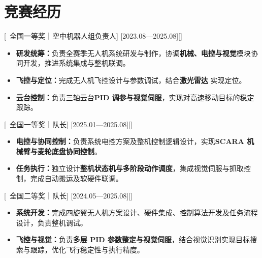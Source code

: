 \documentclass{resume}
\begin{document}
\section{\textcolor{myblue}{竞赛经历}}

[\textcolor{deepred}{\ 全国一等奖｜空中机器人组负责人}]
[2023.08—2025.08][\small]

\begin{itemize}
  \item \textbf{研发统筹：}负责全赛季无人机系统研发与制作，协调\textbf{机械、电控与视觉}模块协同开发，推进系统集成与整机联调。
  \item \textbf{飞控与定位：}完成无人机飞控设计与参数调试，结合\textbf{激光雷达} 实现定位。
  \item \textbf{云台控制：}负责三轴云台\textbf{PID 调参与视觉伺服}，实现对高速移动目标的稳定跟踪。
\end{itemize}

[\textcolor{deepred}{\ 全国一等奖｜队长}]
[2025.01—2025.08][\small]

\begin{itemize}
  \item \textbf{电控与协同控制：}负责系统电控方案及整机控制逻辑设计，实现\textbf{SCARA 机械臂与麦轮底盘协同控制}。
  \item \textbf{任务执行：}独立设计\textbf{整机状态机与多阶段动作调度}，集成视觉伺服与抓取控制，完成自动搬运及软硬件联调。
\end{itemize}

[\textcolor{deepred}{\ 全国二等奖｜队长}]
[2024.05—2025.08][\small]

\begin{itemize}
  \item \textbf{系统开发：}完成四旋翼无人机方案设计、硬件集成、控制算法开发及任务流程设计，负责整机调试。
  \item \textbf{飞控与视觉：}负责\textbf{多层 PID 参数整定与视觉伺服}，结合视觉识别实现目标搜索与跟踪，优化飞行稳定性与执行精度。
\end{itemize}
\end{document}
